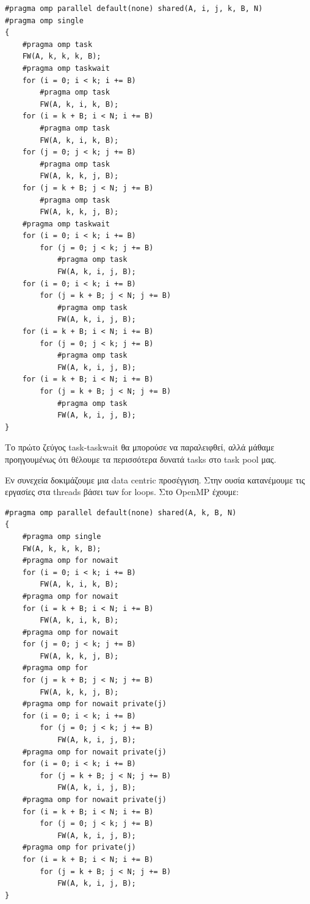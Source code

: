 \documentclass[12pt,titlepage]{article}
\begin{document}
\begin{verbatim}
#pragma omp parallel default(none) shared(A, i, j, k, B, N)
#pragma omp single
{
    #pragma omp task
    FW(A, k, k, k, B);
    #pragma omp taskwait
    for (i = 0; i < k; i += B)
        #pragma omp task
        FW(A, k, i, k, B);
    for (i = k + B; i < N; i += B)
        #pragma omp task
        FW(A, k, i, k, B);
    for (j = 0; j < k; j += B)
        #pragma omp task
        FW(A, k, k, j, B);
    for (j = k + B; j < N; j += B)
        #pragma omp task
        FW(A, k, k, j, B);
    #pragma omp taskwait
    for (i = 0; i < k; i += B)
        for (j = 0; j < k; j += B)
            #pragma omp task
            FW(A, k, i, j, B);
    for (i = 0; i < k; i += B)
        for (j = k + B; j < N; j += B)
            #pragma omp task
            FW(A, k, i, j, B);
    for (i = k + B; i < N; i += B)
        for (j = 0; j < k; j += B)
            #pragma omp task
            FW(A, k, i, j, B);
    for (i = k + B; i < N; i += B)
        for (j = k + B; j < N; j += B)
            #pragma omp task
            FW(A, k, i, j, B);
}
\end{verbatim}

Το πρώτο ζεύγος task-taskwait θα μπορούσε να παραλειφθεί, αλλά μάθαμε
προηγουμένως ότι θέλουμε τα περισσότερα δυνατά tasks στο task pool μας.

Εν συνεχεία δοκιμάζουμε μια data centric προσέγγιση. Στην ουσία κατανέμουμε τις
εργασίες στα threads βάσει των for loops. Στο OpenMP έχουμε:

\begin{verbatim}
#pragma omp parallel default(none) shared(A, k, B, N)
{
    #pragma omp single
    FW(A, k, k, k, B);
    #pragma omp for nowait
    for (i = 0; i < k; i += B)
        FW(A, k, i, k, B);
    #pragma omp for nowait
    for (i = k + B; i < N; i += B)
        FW(A, k, i, k, B);
    #pragma omp for nowait
    for (j = 0; j < k; j += B)
        FW(A, k, k, j, B);
    #pragma omp for
    for (j = k + B; j < N; j += B)
        FW(A, k, k, j, B);
    #pragma omp for nowait private(j)
    for (i = 0; i < k; i += B)
        for (j = 0; j < k; j += B)
            FW(A, k, i, j, B);
    #pragma omp for nowait private(j)
    for (i = 0; i < k; i += B)
        for (j = k + B; j < N; j += B)
            FW(A, k, i, j, B);
    #pragma omp for nowait private(j)
    for (i = k + B; i < N; i += B)
        for (j = 0; j < k; j += B)
            FW(A, k, i, j, B);
    #pragma omp for private(j)
    for (i = k + B; i < N; i += B)
        for (j = k + B; j < N; j += B)
            FW(A, k, i, j, B);
}
\end{verbatim}
\end{document}
